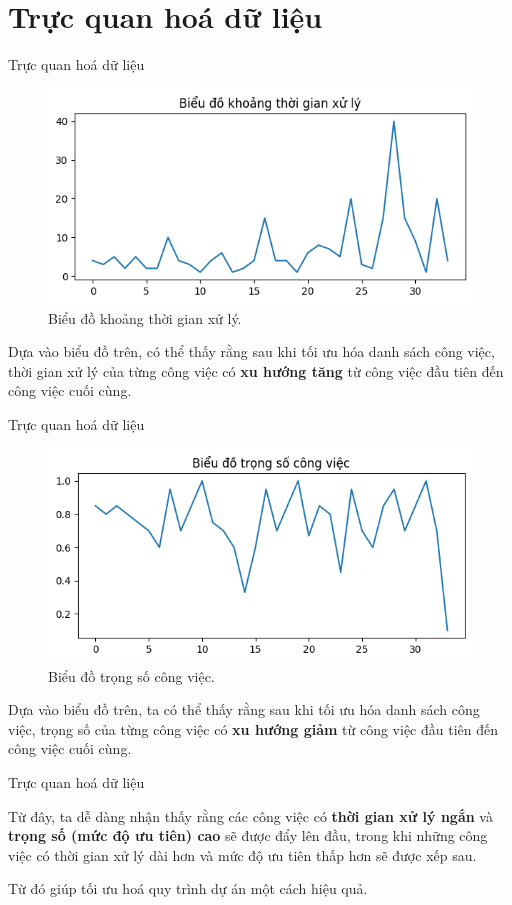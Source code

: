 \documentclass[10pt]{beamer}
\begin{document}
\section*{Trực quan hoá dữ liệu}

\begin{frame}{Trực quan hoá dữ liệu}
\begin{figure}[h]
\centering
\includegraphics[width=0.7\linewidth]{output_project_p.png}
\caption{Biểu đồ khoảng thời gian xử lý.}
\end{figure}

Dựa vào biểu đồ trên, có thể thấy rằng sau khi tối ưu hóa danh sách công việc, thời gian xử lý của từng công việc có \textbf{xu hướng tăng} từ công việc đầu tiên đến công việc cuối cùng.
\end{frame}

\begin{frame}{Trực quan hoá dữ liệu}
\begin{figure}[h]
\centering
\includegraphics[width=0.7\linewidth]{output_project_w.png}
\caption{Biểu đồ trọng số công việc.}
\end{figure}

Dựa vào biểu đồ trên, ta có thể thấy rằng sau khi tối ưu hóa danh sách công việc, trọng số của từng công việc có \textbf{xu hướng giảm} từ công việc đầu tiên đến công việc cuối cùng.
\end{frame}

\begin{frame}{Trực quan hoá dữ liệu}

Từ đây, ta dễ dàng nhận thấy rằng các công việc có \textbf{thời gian xử lý ngắn} và \textbf{trọng số (mức độ ưu tiên) cao} sẽ được đẩy lên đầu, trong khi những công việc có thời gian xử lý dài hơn và mức độ ưu tiên thấp hơn sẽ được xếp sau.

Từ đó giúp tối ưu hoá quy trình dự án một cách hiệu quả.
\end{frame}



\begin{frame}
    \nocite{*}
    \printbibliography
\end{frame}


\begin{frame}
    \begin{block}{}
    \medskip
    \center{\huge \it \textcolor[rgb]{0.50,0.30,1.0}{Cảm ơn mọi người đã quan tâm theo dõi!}}
    \medskip
    \end{block}	
\end{frame}    
\end{document}
